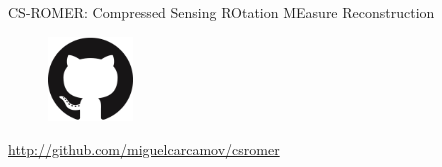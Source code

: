 \documentclass[xetex,aspectratio=169]{beamer}
\begin{document}
        
    
   \begin{frame}{CS-ROMER: Compressed Sensing ROtation MEasure Reconstruction}
            \begin{figure}
                \centering
                \includegraphics[width=0.2\textwidth]{figures/logos/GitHub-Mark-120px-plus.png}
            \end{figure}
            
            \begin{center}
             \url{http://github.com/miguelcarcamov/csromer} 
            \end{center}
            

    \end{frame}
  
\end{document}

